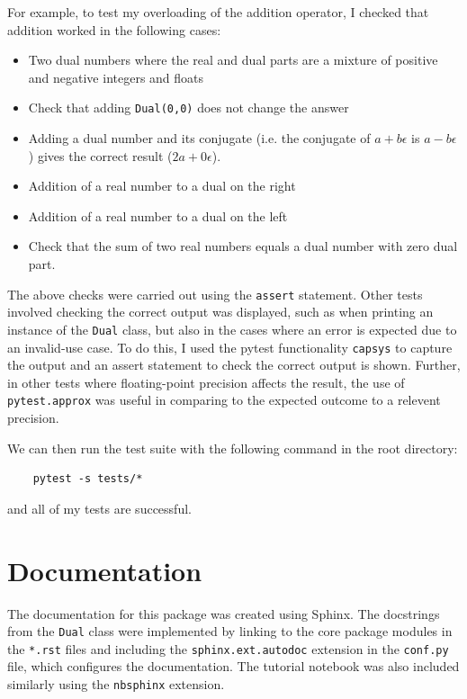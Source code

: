 \documentclass{article}
\begin{document}
For example, to test my overloading of the addition operator, I checked that addition worked in the following cases:
\begin{itemize}
    \item Two dual numbers where the real and dual parts are a mixture of positive and negative integers and floats
    \item Check that adding \texttt{Dual(0,0)} does not change the answer
    \item Adding a dual number and its conjugate (i.e. the conjugate of $a+b\epsilon$ is $a-b\epsilon$) gives the correct result  ($2a+0\epsilon$).
    \item Addition of a real number to a dual on the right
    \item Addition of a real number to a dual on the left
    \item Check that the sum of two real numbers equals a dual number with zero dual part.
\end{itemize}

The above checks were carried out using the \texttt{assert} statement. Other tests involved checking the correct output was displayed, such as when printing an instance of the \texttt{Dual} class, but also in the cases where an error is expected due to an invalid-use case. To do this, I used the pytest functionality \texttt{capsys} to capture the output and an assert statement to check the correct output is shown. Further, in other tests where floating-point precision affects the result, the use of \texttt{pytest.approx} was useful in comparing to the expected outcome to a relevent precision. 

We can then run the test suite with the following command in the root directory:
\begin{lstlisting}
    pytest -s tests/*
\end{lstlisting}
and all of my tests are successful. 

\section{Documentation} \label{docs}
The documentation for this package was created using Sphinx. The docstrings from the \texttt{Dual} class were implemented by linking to the core package modules in the \texttt{*.rst} files and including the \texttt{sphinx.ext.autodoc} extension in the \texttt{conf.py} file, which configures the documentation. The tutorial notebook was also included similarly using the \texttt{nbsphinx} extension. 
\end{document}
